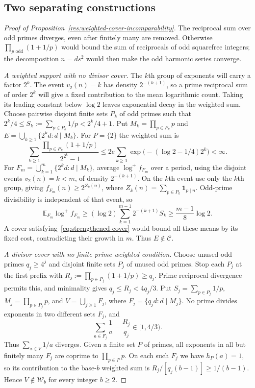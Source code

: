 \documentclass[11pt]{article}
\begin{document}
\subsection{Two separating constructions}
\begin{proof}[Proof of Proposition~\ref{res:weighted-cover-incomparability}]
The reciprocal sum over odd primes diverges, even after finitely many
are removed.  Otherwise $\prod_{p\text{ odd}}(1+1/p)$ would bound the sum of reciprocals of
odd squarefree integers; the decomposition $n=ds^2$ would
then make the odd harmonic series converge.

\emph{A weighted support with no divisor cover.}
The $k$th group of exponents will carry a factor $2^k$. The event $v_2(n)=k$ has density $2^{-(k+1)}$, so a prime
reciprocal sum of order $2^k$ will give a fixed contribution to the
mean logarithmic count. Taking its leading constant below $\log2$
leaves exponential decay in the weighted sum.
Choose pairwise disjoint finite sets $P_k$ of odd primes such that
$2^k/4\le S_k:=\sum_{p\in P_k}1/p<2^k/4+1$.  Put
$M_k=\prod_{p\in P_k}p$ and
$E=\bigcup_{k\ge1}\{2^kd:d\mid M_k\}$.
For $P=\{2\}$ the weighted sum is
\[
 \sum_{k\ge1}\frac{\prod_{p\in P_k}(1+1/p)}{2^{2^k}-1}
 \le 2e\sum_{k\ge1}
       \exp\bigl(-(\log2-1/4)2^k\bigr)<\infty.
\]
For $F_m=\bigcup_{k=1}^m\{2^kd:d\mid M_k\}$, average
$\log^+f_{F_m}$ over a period, using the disjoint events
$v_2(n)=k<m$, of density $2^{-(k+1)}$.
On the $k$th event use only the $k$th group, giving
$f_{F_m}(n)\ge2^{Z_k(n)}$, where
$Z_k(n)=\sum_{p\in P_k}\mathbf1_{p\mid n}$. Odd-prime divisibility
is independent of that event, so
\[
 \mathbb E_{F_m}\log^+f_{F_m}
 \ge(\log2)\sum_{k=1}^{m-1}2^{-(k+1)}S_k
 \ge\frac{m-1}{8}\log2.
\]
A cover satisfying~\eqref{eq:strengthened-cover} would bound all these
means by its fixed cost, contradicting their growth in $m$.
Thus $E\notin\mathcal C$.

\emph{A divisor cover with no finite-prime weighted condition.}
Choose unused odd primes $q_j\ge4^j$ and
disjoint finite sets $P_j$ of unused odd primes.  Stop each $P_j$
at the first prefix with $R_j:=\prod_{p\in P_j}(1+1/p)\ge q_j$.
Prime reciprocal divergence permits this, and minimality gives
$q_j\le R_j<4q_j/3$.
Put $S_j=\sum_{p\in P_j}1/p$, $M_j=\prod_{p\in P_j}p$, and
$V=\bigcup_{j\ge1}F_j$, where $F_j=\{q_jd:d\mid M_j\}$.
No prime divides exponents in two different sets $F_j$, and
\[
 \sum_{a\in F_j}\frac1a=\frac{R_j}{q_j}\in[1,4/3).
\]
Thus $\sum_{a\in V}1/a$ diverges. Given a finite set $P$ of primes,
all exponents in all but finitely many $F_j$ are coprime to
$\prod_{p\in P}p$. On each such $F_j$ we have $h_P(a)=1$, so its
contribution to the base-$b$ weighted sum is
$R_j/[q_j(b-1)]\ge1/(b-1)$. Hence $V\notin\mathcal W_b$ for every
integer $b\ge2$.


\end{proof}
\end{document}
